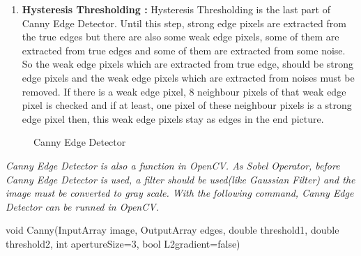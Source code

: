 \begin{enumerate}
\item \textbf{Hysteresis Thresholding : } Hysteresis Thresholding is the last part of Canny Edge Detector. Until this step, strong edge pixels are extracted from the true edges but there are also some weak edge pixels, some of them are extracted from true edges and some of them are extracted from some noise. So the weak edge pixels which are extracted from true edge, should be strong edge pixels and the weak edge pixels which are extracted from noises must be removed. If there is a weak edge pixel, 8 neighbour pixels of that weak edge pixel is checked and if at least, one pixel of these neighbour pixels is a strong edge pixel then, this weak edge pixels stay as edges in the end picture. 

\end{enumerate}


\begin{figure}[H]
  \centering
  \hfill
  \caption{Canny Edge Detector\cite{Canny_Edge_Detector}}
\end{figure} 

\emph{\color{blue}Canny Edge Detector is also a function in OpenCV. As Sobel Operator, before Canny Edge Detector is used, a filter should be used(like Gaussian Filter) and the image must be converted to gray scale. With the following command, Canny Edge Detector can be runned in OpenCV.\cite{Canny_Edge_Detector3}}

 \begin{center}
 
void Canny(InputArray image, OutputArray edges, double threshold1, double threshold2, int apertureSize=3, bool L2gradient=false)

 \end{center}
 
